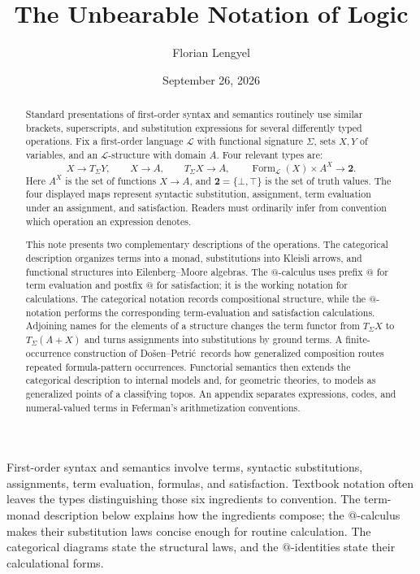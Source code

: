\documentclass[11pt]{article}
\title{The Unbearable Notation of Logic}
\author{Florian Lengyel}
\date{September 26, 2026}
\makeatletter
\newcommand{\atsign}{\mathord{@}}
\newcommand{\DP}{Do\v{s}en--Petri\'{c}}
\theoremstyle{definition}
\makeatother
\begin{document}
\maketitle

\begin{abstract}
Standard presentations of first-order syntax and semantics routinely use
similar brackets, superscripts, and substitution expressions for several
differently typed operations. Fix a first-order language \(\mathcal L\) with
functional signature \(\Sigma\), sets \(X,Y\) of variables, and an
\(\mathcal L\)-structure with domain \(A\). Four relevant types are:
\[
X\to T_\Sigma Y,\qquad X\to A,\qquad
T_\Sigma X\to A,\qquad
\operatorname{Form}_{\mathcal L}(X)\times A^X\to\mathbf 2.
\]
Here \(A^X\) is the set of functions \(X\to A\), and
\(\mathbf2=\{\bot,\top\}\) is the set of truth values. The four displayed maps
represent syntactic substitution, assignment, term evaluation under an
assignment, and satisfaction. Readers must ordinarily infer from convention
which operation an expression denotes.

This note presents two complementary descriptions of the operations. The categorical
description organizes terms into a monad, substitutions into Kleisli arrows,
and functional structures into Eilenberg--Moore algebras. The $\atsign$-calculus
uses prefix $\atsign$ for term evaluation and postfix $\atsign$ for satisfaction;
it is the working notation for calculations. The categorical notation records
compositional structure, while the $\atsign$-notation performs the corresponding
term-evaluation and satisfaction calculations. Adjoining names for the elements of a structure changes the
term functor from $T_\Sigma X$ to $T_\Sigma(A+X)$ and turns assignments into
substitutions by ground terms. A finite-occurrence construction of \DP\ records
how generalized composition routes repeated formula-pattern occurrences.
Functorial semantics then extends the categorical
description to internal models and, for geometric theories, to models as
generalized points of a classifying topos. An appendix separates
expressions, codes, and numeral-valued terms in Feferman's
arithmetization conventions.
\end{abstract}

First-order syntax and semantics involve terms, syntactic substitutions,
assignments, term evaluation, formulas, and satisfaction. Textbook notation
often leaves the types distinguishing those six ingredients to convention.
The term-monad description below explains how the ingredients compose; the
$\atsign$-calculus makes their substitution laws concise enough for routine
calculation. The categorical diagrams state the structural laws, and the
$\atsign$-identities state their calculational forms.
\end{document}
